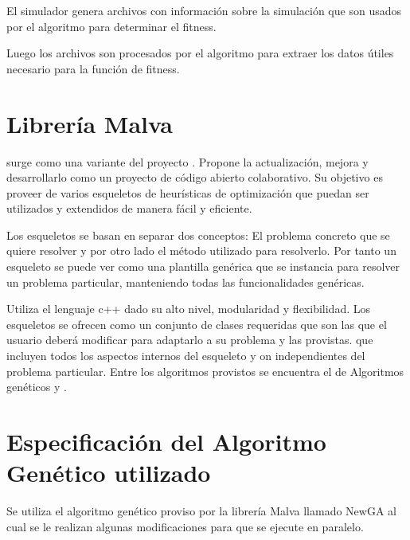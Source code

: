 El simulador genera archivos con información sobre la simulación que son usados por el algoritmo para determinar el fitness.

Luego los archivos son procesados por el algoritmo para extraer los datos útiles necesario para la función de fitness.







\section{Librería Malva}

\citep{Malva} surge como una variante del proyecto \citep{Mallba}. Propone la actualización, mejora y desarrollarlo como un proyecto de código abierto colaborativo.  Su objetivo es proveer de varios esqueletos de  heurísticas de optimización que puedan ser utilizados y extendidos de manera fácil y eficiente.

Los esqueletos se basan en separar dos conceptos: El problema concreto que se quiere resolver y por otro lado el método utilizado para resolverlo. Por tanto un esqueleto se puede ver como una plantilla genérica que se instancia para resolver un problema particular, manteniendo todas las funcionalidades genéricas.

Utiliza el lenguaje c++ dado su alto nivel, modularidad y flexibilidad. Los esqueletos se ofrecen como un conjunto de clases requeridas que son las que el usuario deberá modificar para adaptarlo a su problema y las provistas. que incluyen todos los aspectos internos del esqueleto y on independientes del problema particular. Entre los algoritmos provistos se encuentra el de Algoritmos genéticos y \citep{CHC}.


\newpage

\section{Especificación del Algoritmo Genético utilizado}
Se utiliza el algoritmo genético proviso por la librería  Malva  llamado NewGA al cual se le realizan algunas modificaciones para que se ejecute en paralelo.


